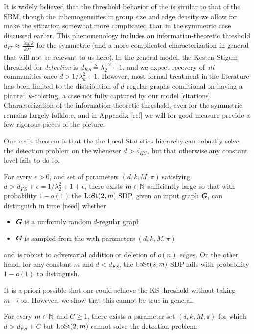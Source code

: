 It is widely believed that the threshold behavior of the \model is similar to that of the SBM, though the inhomogeneities in group size and edge density we allow for make the situation somewhat more complicated than in the symmetric case discussed earlier. This phenomenology includes an information-theoretic threshold $d_{IT} \approx \frac{\log k}{k\lambda_2^2}$ for the symmetric \model (and a more complicated characterization in general that will not be relevant to us here). In the general model, the Kesten-Stigum threshold for \emph{detection} is $d_{KS} \triangleq \lambda_2^{-2} + 1$, and we expect recovery of \emph{all} communities once $d> 1/\lambda_k^2 + 1$. However, most formal treatment in the literature has been limited to the distribution of $d$-regular graphs conditional on having a planted $k$-coloring, a case not fully captured by our model [citations]. Characterization of the information-theoretic threshold, even for the symmetric \model remains largely folklore, and in Appendix [ref] we will for good measure provide a few rigorous pieces of the picture. 

Our main theorem is that the the Local Statistics hierarchy can robustly solve the detection problem on the \model whenever $d > d_{KS}$, but that otherwise any constant level fails to do so.

\begin{theorem} \label{thm:main}
	For every $\epsilon > 0$, and set of parameters $(d,k,M,\pi)$ satisfying $d > d_{KS} + \epsilon = 1/\lambda_2^2 + 1 + \epsilon$, there exists $m \in \mathbb{N}$ sufficiently large so that with probability $1-o(1)$ the $\operatorname{LoSt}(2,m)$ SDP, given an input graph $\boldsymbol{G}$, can distinguish in time [need] whether
	\begin{itemize}
		\item $\boldsymbol{G}$ is a uniformly random $d$-regular graph
		\item $\boldsymbol{G}$ is sampled from the \model with parameters $(d,k,M,\pi)$
	\end{itemize}
	and is robust to adversarial addition or deletion of $o(n)$ edges. On the other hand, for any constant $m$ and $d< d_{KS}$, the $\operatorname{LoSt}(2,m)$ SDP fails with probability $1 - o(1)$ to distinguish.
\end{theorem}

\noindent It is a priori possible that one could achieve the KS threshold without taking $m\to \infty$. However, we show that this cannot be true in general.

\begin{theorem}
    For every $m\in\mathbb{N}$ and $C\ge 1$, there exists a parameter set $(d,k,M,\pi)$ for which $d > d_{KS} + C$ but $\operatorname{LoSt}(2,m)$ cannot solve the detection problem.
\end{theorem}


